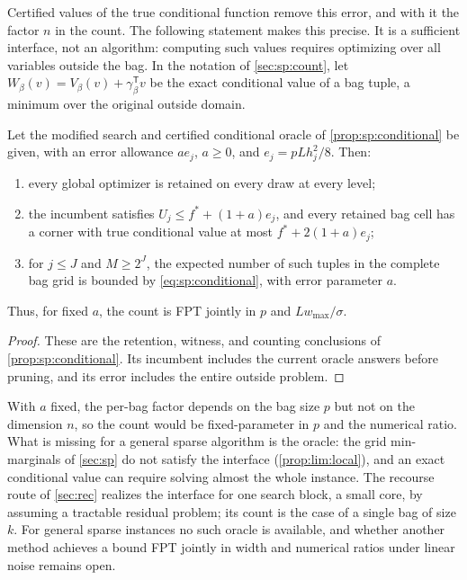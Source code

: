 Certified values of the true conditional function remove this error, and
with it the factor $n$ in the count. The following statement makes this
precise. It is a sufficient interface, not an algorithm: computing such
values requires optimizing over all variables outside the bag. In the
notation of \cref{sec:sp:count}, let
$W_\beta(v)=V_\beta(v)+\gamma_\beta^{\mathsf T}v$ be the exact conditional
value of a bag tuple, a minimum over the original outside domain.

\begin{corollary}\label{prop:lim:conditional}
Let the modified search and certified conditional oracle of
\cref{prop:sp:conditional} be given, with an error allowance $ae_j$,
$a\ge0$, and $e_j=pLh_j^2/8$. Then:
\begin{enumerate}[label=(\alph*)]
\item\label{it:lim:cond-sound} every global optimizer is retained on every
 draw at every level;
\item\label{it:lim:cond-witness} the incumbent satisfies
 $U_j\le f^*+(1+a)e_j$, and every retained bag cell has a corner with true
 conditional value at most $f^*+2(1+a)e_j$;
\item\label{it:lim:cond-count} for $j\le J$ and $M\ge2^J$, the expected
 number of such tuples in the complete bag grid is bounded by
 \eqref{eq:sp:conditional}, with error parameter $a$.
\end{enumerate}
Thus, for fixed $a$, the count is FPT jointly in $p$ and $Lw_{\max}/\sigma$.
\end{corollary}

\begin{proof}
These are the retention, witness, and counting conclusions of
\cref{prop:sp:conditional}. Its incumbent includes the current oracle
answers before pruning, and its error includes the entire outside problem.
\end{proof}

With $a$ fixed, the per-bag factor depends on the bag size $p$ but not on
the dimension $n$, so the count would be fixed-parameter in $p$ and the
numerical ratio. What is missing for a general sparse algorithm is the
oracle: the grid min-marginals of \cref{sec:sp} do not satisfy the interface
(\cref{prop:lim:local}), and an exact conditional value can require solving
almost the whole instance. The recourse route of \cref{sec:rec} realizes the
interface for one search block, a small core, by assuming a tractable
residual problem; its count is the case of a single bag of size $k$. For
general sparse instances no such oracle is available, and whether another
method achieves a bound FPT jointly in width and numerical ratios under linear noise
remains open.


